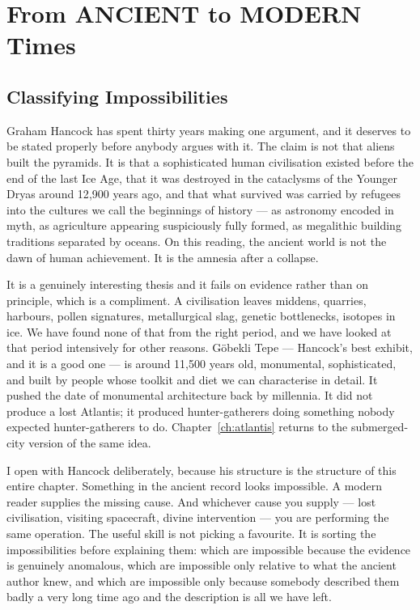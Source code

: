 \chapter{From ANCIENT to MODERN Times}\label{ch:ancient}


\section{Classifying Impossibilities}\label{sec:classifyingimpossibiliti}

Graham Hancock has spent thirty years making one argument, and it deserves to be stated properly
before anybody argues with it. The claim is not that aliens built the pyramids. It is that a
sophisticated human civilisation existed before the end of the last Ice Age, that it was destroyed
in the cataclysms of the Younger Dryas around 12{,}900 years ago, and that what survived was
carried by refugees into the cultures we call the beginnings of history --- as astronomy encoded in
myth, as agriculture appearing suspiciously fully formed, as megalithic building traditions
separated by oceans. On this reading, the ancient world is not the dawn of human achievement. It
is the amnesia after a collapse.

It is a genuinely interesting thesis and it fails on evidence rather than on principle, which is a
compliment. A civilisation leaves middens, quarries, harbours, pollen signatures, metallurgical
slag, genetic bottlenecks, isotopes in ice. We have found none of that from the right period, and
we have looked at that period intensively for other reasons. G\"obekli Tepe --- Hancock's best
exhibit, and it is a good one --- is around 11{,}500 years old, monumental, sophisticated, and
built by people whose toolkit and diet we can characterise in detail. It pushed the date of
monumental architecture back by millennia. It did not produce a lost Atlantis; it produced
hunter-gatherers doing something nobody expected hunter-gatherers to do. Chapter~\ref{ch:atlantis} returns to
the submerged-city version of the same idea.

I open with Hancock deliberately, because his structure is the structure of this entire chapter.
Something in the ancient record looks impossible. A modern reader supplies the missing cause. And
whichever cause you supply --- lost civilisation, visiting spacecraft, divine intervention --- you
are performing the same operation. The useful skill is not picking a favourite. It is sorting the
impossibilities before explaining them: which are impossible because the evidence is
genuinely anomalous, which are impossible only relative to what the ancient author knew, and which
are impossible only because somebody described them badly a very long time ago and the description
is all we have left.

